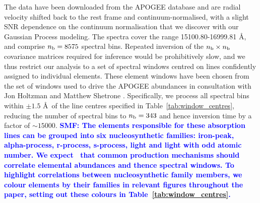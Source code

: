 \documentclass[a4paper,fleqn,usenatbib]{mnras}
\newcommand{\nb}{n_{\rm b}}
\newcommand{\smf}[1]{\textbf{\textcolor{blue}{SMF: #1}}}
\begin{document}
The data have been downloaded from the APOGEE database and are radial velocity shifted back to the rest frame and continuum-normalised, with a slight SNR dependence on the continuum normalisation that we discover with our Gaussian Process modeling. The spectra cover the range 15100.80-16999.81 \AA, and comprise $\nb = 8575$ spectral bins. Repeated inversion of the $\nb \times \nb$ covariance matrices required for inference would be prohibitively slow, and we thus restrict our analysis to a set of spectral windows centred on lines confidently assigned to individual elements. These element windows have been chosen from the set of windows used to drive the APOGEE abundances in consultation with Jon Holtzman and Matthew Shetrone \citep{Holtzman2015, Shetrone2015}. Specifically, we process all spectral bins within $\pm 1.5$ \AA\ of the line centres specified in Table~\ref{tab:window_centres}, reducing the number of spectral bins to $\nb = 343$ and hence inversion time by a factor of $\sim15000$. %
\smf{The elements responsible for these absorption lines can be grouped into six nucleosynthetic families: iron-peak, alpha-process, r-process, s-process, light and light with odd atomic number. We expect~\cite{something} that common production mechanisms should correlate elemental abundances and thence spectral windows. To highlight correlations between nucleosynthetic family members, we colour elements by their families in relevant figures throughout the paper, setting out these colours in Table~\ref{tab:window_centres}.}
\end{document}
